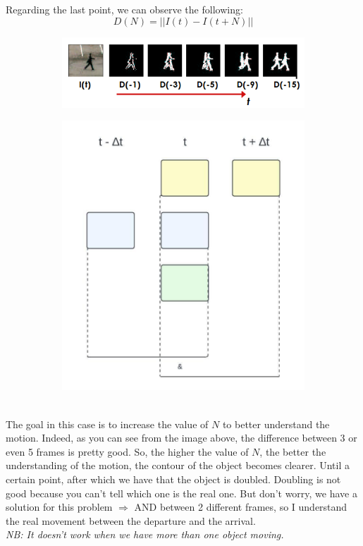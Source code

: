 Regarding the last point, we can observe the following:
\[D(N) = ||I(t)-I(t+N)||\]
\begin{figure}[h]
    \begin{subfigure}{0.6\textwidth}
        \includegraphics[scale=0.5]{Figures/FrameDifferencing.png} 
    \end{subfigure}
    \begin{subfigure}{0.4\textwidth}
        \includegraphics[scale=0.5]{Figures/DifferencingDiagram.jpeg}    \end{subfigure}
        \label{fig:image2}
\end{figure}\\
The goal in this case is to increase the value of $N$ to better understand the motion. Indeed, as you can see from the image above, the difference between 3 or even 5 frames is pretty good.
So, the higher the value of $N$, the better the understanding of the motion, the contour of the object becomes clearer. Until a certain point, after which we have that the object is doubled.
Doubling is not good because you can't tell which one is the real one. But don't worry, we have a solution for this problem $\Rightarrow$ AND between 2 different frames, so I understand the real movement between the departure and the arrival.
\\\textit{NB: It doesn't work when we have more than one object moving.}
